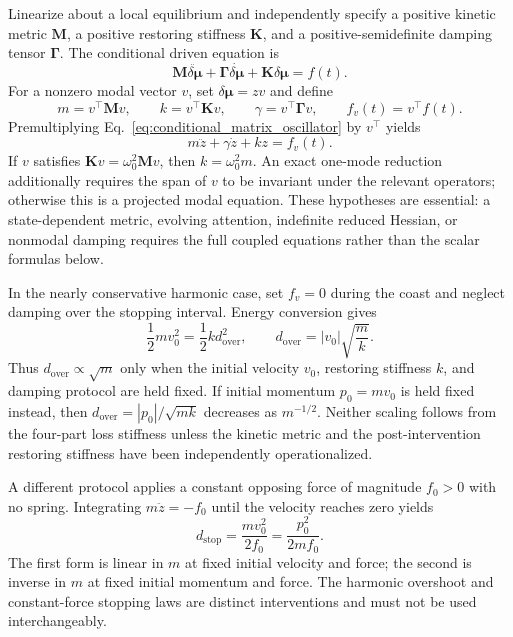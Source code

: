 \documentclass[12pt]{article}
\begin{document}
Linearize about a local equilibrium and independently specify a positive kinetic metric $\mathbf M$, a positive restoring stiffness $\mathbf K$, and a positive-semidefinite damping tensor $\boldsymbol\Gamma$.  The conditional driven equation is
\begin{equation}
\mathbf M\ddot{\delta\boldsymbol\mu}
+\boldsymbol\Gamma\dot{\delta\boldsymbol\mu}
+\mathbf K\delta\boldsymbol\mu
=f(t).
\label{eq:conditional_matrix_oscillator}
\end{equation}
For a nonzero modal vector $v$, set $\delta\boldsymbol\mu=zv$ and define
\begin{equation}
m=v^\top\mathbf Mv,
\qquad
k=v^\top\mathbf Kv,
\qquad
\gamma=v^\top\boldsymbol\Gamma v,
\qquad
f_v(t)=v^\top f(t).
\label{eq:conditional_modal_scalars}
\end{equation}
Premultiplying Eq.~\eqref{eq:conditional_matrix_oscillator} by $v^\top$ yields
\begin{equation}
\boxed{m\ddot z+\gamma\dot z+kz=f_v(t).}
\label{eq:conditional_modal_oscillator}
\end{equation}
If $v$ satisfies $\mathbf Kv=\omega_0^2\mathbf Mv$, then $k=\omega_0^2m$.  An exact one-mode reduction additionally requires the span of $v$ to be invariant under the relevant operators; otherwise this is a projected modal equation.  These hypotheses are essential: a state-dependent metric, evolving attention, indefinite reduced Hessian, or nonmodal damping requires the full coupled equations rather than the scalar formulas below.

In the nearly conservative harmonic case, set $f_v=0$ during the coast and neglect damping over the stopping interval.  Energy conversion gives
\begin{equation}
\frac12m v_0^2=\frac12k d_{\mathrm{over}}^2,
\qquad
\boxed{d_{\mathrm{over}}=|v_0|\sqrt{\frac{m}{k}}.}
\label{eq:conditional_harmonic_overshoot}
\end{equation}
Thus $d_{\mathrm{over}}\propto\sqrt m$ only when the initial velocity $v_0$, restoring stiffness $k$, and damping protocol are held fixed.  If initial momentum $p_0=mv_0$ is held fixed instead, then $d_{\mathrm{over}}=|p_0|/\sqrt{mk}$ decreases as $m^{-1/2}$.  Neither scaling follows from the four-part loss stiffness unless the kinetic metric and the post-intervention restoring stiffness have been independently operationalized.

A different protocol applies a constant opposing force of magnitude $f_0>0$ with no spring.  Integrating $m\ddot z=-f_0$ until the velocity reaches zero yields
\begin{equation}
\boxed{
d_{\mathrm{stop}}=\frac{m v_0^2}{2f_0}
=\frac{p_0^2}{2mf_0}.}
\label{eq:conditional_ballistic_stop}
\end{equation}
The first form is linear in $m$ at fixed initial velocity and force; the second is inverse in $m$ at fixed initial momentum and force.  The harmonic overshoot and constant-force stopping laws are distinct interventions and must not be used interchangeably.
\end{document}
